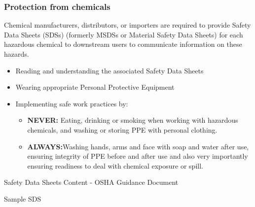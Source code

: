 \subsubsection{Protection from chemicals}
Chemical manufacturers, distributors, or importers are required to provide Safety Data Sheets (SDSs) (formerly MSDSs or Material Safety Data Sheets) for each hazardous chemical to downstream users to communicate information on these hazards.
\begin{itemize}
\item Reading and understanding the associated Safety Data Sheets
\item Wearing appropriate Personal Protective Equipment
\item Implementing safe work practices by:
\begin{itemize}
\item \textbf{NEVER:} Eating, drinking or smoking when working with hazardous chemicals, and washing or storing PPE with personal clothing.
\item \textbf{ALWAYS:}Washing hands, arms and face with soap and water after use, ensuring integrity of PPE before and after use and also very importantly ensuring  readiness to deal with chemical exposure or spill.
\end{itemize}
\end{itemize}
\newpage
\hspace{0pt}
\vfill
\begin{center}
Safety Data Sheets Content - OSHA Guidance Document
\end{center}
\vfill
\hspace{0pt}
\pagebreak
\hspace{0pt}
\vfill
\begin{center}
\end{center}
\vfill
\hspace{0pt}
\pagebreak




\newpage
\hspace{0pt}
\vfill
\begin{center}
Sample SDS
\end{center}
\vfill
\hspace{0pt}
\pagebreak
\hspace{0pt}
\vfill
\begin{center}
\end{center}
\vfill
\hspace{0pt}
\pagebreak



